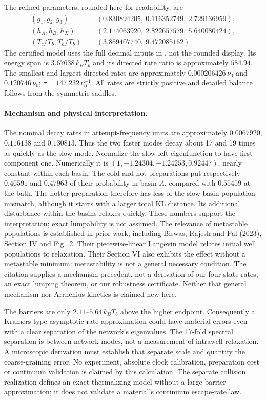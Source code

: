 \documentclass[11pt]{article}
\begin{document}
The refined parameters, rounded here for readability, are
\[
\begin{split}
(g_1,g_2,g_3)&=(0.830894205,\ 0.116352749,\ 2.729136959),\\
(h_A,h_B,h_X)&=(2.114063920,\ 2.822657579,\ 5.640080424),\\
(T_c/T_b,T_h/T_b)&=(3.869407740,\ 9.472085162).
\end{split}
\]
The certified model uses the full decimal inputs in
, not the rounded display.
Its energy span is $3.67638\,k_BT_b$ and its directed rate ratio is
approximately $584.94$. The smallest and largest directed rates are
approximately $0.000206426\,\nu_0$ and $0.120746\,\nu_0$;
$\tau=147.232\,\nu_0^{-1}$. All rates are strictly positive and detailed
balance follows from the symmetric saddles.

\paragraph{Mechanism and physical interpretation.}
The nominal decay rates in attempt-frequency units are approximately
$0.0067920$, $0.116138$ and $0.130813$. Thus the two faster modes decay
about 17 and 19 times as quickly as the slow mode.
Normalize the slow left eigenfunction to have first component one.
Numerically it is $(1,-1.24304,-1.24253,0.92447)$, nearly constant within
each basin. The cold and hot preparations put respectively $0.46591$
and $0.47963$ of their probability in basin $A$, compared with $0.55459$
at the bath. The hotter preparation therefore has less of the slow
basin-population mismatch, although it starts with a larger total KL
distance. Its additional disturbance within the basins relaxes quickly.
These numbers support the interpretation; exact lumpability is not assumed.
The relevance of metastable populations is established in prior work,
including \href{https://arxiv.org/abs/2304.06420v2}{Biswas, Rajesh and Pal
(2023), Section IV and Fig.~2}. Their piecewise-linear Langevin model
relates initial well populations to relaxation. Their Section VI also
exhibits the effect without a metastable minimum: metastability is not a
general necessary condition. The citation supplies a mechanism precedent,
not a derivation of our four-state rates, an exact lumping theorem, or our
robustness certificate. Neither that general mechanism nor Arrhenius
kinetics is claimed new here.

The barriers are only $2.11$--$5.64\,k_BT_b$ above the higher endpoint.
Consequently a Kramers-type asymptotic rate approximation could have
material errors even with a clear separation of the network's eigenvalues.
The 17-fold spectral separation is between network modes, not a measurement
of intrawell relaxation. A microscopic derivation must establish that
separate scale and quantify the coarse-graining error. No experiment,
absolute clock calibration, preparation cost or continuum validation is
claimed by this calculation.
The separate collision realization defines an exact thermalizing model
without a large-barrier approximation; it does not validate a material's
continuum escape-rate law.
\end{document}
